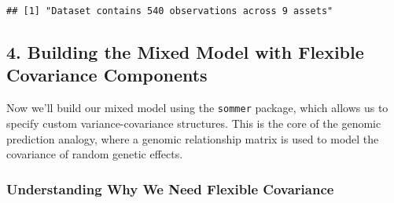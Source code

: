 \documentclass[
]{article}
\newenvironment{Shaded}{\begin{snugshade}}{\end{snugshade}}
\newcommand{\AttributeTok}[1]{\textcolor[rgb]{0.13,0.29,0.53}{#1}}
\newcommand{\CommentTok}[1]{\textcolor[rgb]{0.56,0.35,0.01}{\textit{#1}}}
\newcommand{\DecValTok}[1]{\textcolor[rgb]{0.00,0.00,0.81}{#1}}
\newcommand{\FunctionTok}[1]{\textcolor[rgb]{0.13,0.29,0.53}{\textbf{#1}}}
\newcommand{\NormalTok}[1]{#1}
\newcommand{\OtherTok}[1]{\textcolor[rgb]{0.56,0.35,0.01}{#1}}
\newcommand{\SpecialCharTok}[1]{\textcolor[rgb]{0.81,0.36,0.00}{\textbf{#1}}}
\newcommand{\StringTok}[1]{\textcolor[rgb]{0.31,0.60,0.02}{#1}}
\begin{document}
\begin{Shaded}
\end{Shaded}

\begin{verbatim}
## [1] "Dataset contains 540 observations across 9 assets"
\end{verbatim}

\subsection{4. Building the Mixed Model with Flexible Covariance
Components}\label{building-the-mixed-model}

Now we'll build our mixed model using the \texttt{sommer} package, which
allows us to specify custom variance-covariance structures. This is the
core of the genomic prediction analogy, where a genomic relationship
matrix is used to model the covariance of random genetic effects.

\subsubsection{Understanding Why We Need Flexible
Covariance}\label{understanding-why-we-need-flexible-covariance}
\end{document}
